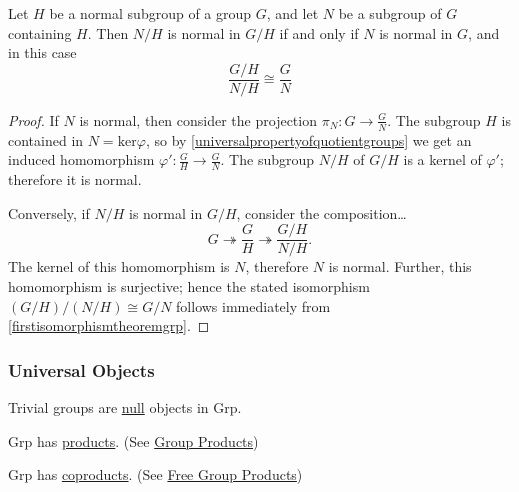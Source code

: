 \begin{theorem}
\label{thirdisomorphismtheoremgrp}
Let $H$ be a normal subgroup of a group $G$, and let $N$ be a subgroup of $G$ containing $H$. Then $N/H$ is normal in $G/H$ if and only if $N$ is normal in $G$,
and in this case
$$\frac{G/H}{N/H} \cong \frac{G}{N}$$
\end{theorem}

\begin{proof}
If $N$ is normal, then consider the projection $\pi_N: G \rightarrow \frac{G}{N}$. The subgroup $H$ is contained in $N = \textrm{ker}\varphi$, so by \ref{universalpropertyofquotientgroups}
we get an induced homomorphism $\varphi' : \frac{G}{H} \rightarrow \frac{G}{N}.$ The subgroup $N/H$ of $G/H$ is a kernel of $\varphi'$; therefore it is normal.

Conversely, if $N/H$ is normal in $G/H$, consider the composition\dots
$$G \twoheadrightarrow \frac{G}{H} \twoheadrightarrow \frac{G/H}{N/H}.$$
The kernel of this homomorphism is $N$, therefore $N$ is normal. Further, this homomorphism is surjective; hence the stated isomorphism $(G/H)/(N/H) \cong G/N$ follows immediately
from \ref{firstisomorphismtheoremgrp}.
\end{proof}

\subsubsection{Universal Objects}

\begin{proposition}
Trivial groups are \hyperref[null]{null} objects in Grp.
\end{proposition}

\begin{proposition}
Grp has \hyperref[products]{products}. (See \hyperref[groupproduct]{Group Products})
\end{proposition}

\begin{proposition}
Grp has \hyperref[coproducts]{coproducts}. (See \hyperref[freegroupproduct]{Free Group Products})
\end{proposition}